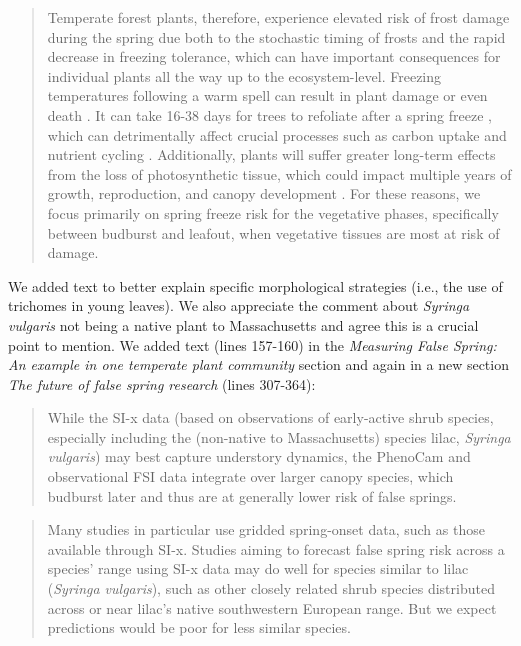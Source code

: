 \documentclass[11pt,a4paper]{article}
\begin{document}
\begin{quotation}
Temperate forest plants, therefore, experience elevated risk of frost damage during the spring due both to the stochastic timing of frosts and the rapid decrease in freezing tolerance, which can have important consequences for individual plants all the way up to the ecosystem-level. Freezing temperatures following a warm spell can result in plant damage or even death \citep{Ludlum1968, Mock2007}. It can take 16-38 days for trees to refoliate after a spring freeze \citep{Augspurger2009, Augspurger2013, Gu2008, Menzel2015}, which can detrimentally affect crucial processes such as carbon uptake and nutrient cycling \citep{Hufkens2012, Klosterman2018, Richardson2013}. Additionally, plants will suffer greater long-term effects from the loss of photosynthetic tissue, which could impact multiple years of growth, reproduction, and canopy development \citep{Vitasse2014, Xie2015}.  For these reasons, we focus primarily on spring freeze risk for the vegetative phases, specifically between budburst and leafout, when vegetative tissues are most at risk of damage.
\end{quotation}

We added text to better explain specific morphological strategies (i.e., the use of trichomes in young leaves). We also appreciate the comment about \textit{Syringa vulgaris} not being a native plant to Massachusetts and agree this is a crucial point to mention. We added text (lines 157-160) in the \textit{Measuring False Spring: An example in one temperate plant community} section and again in a new section \textit{The future of false spring research} (lines 307-364):\\

\begin{quotation}
While the SI-x data (based on observations of early-active shrub species, especially including the (non-native to Massachusetts) species lilac, \emph{Syringa vulgaris}) may best capture understory dynamics, the PhenoCam and observational FSI data integrate over larger canopy species, which budburst later and thus are at generally lower risk of false springs.
\end{quotation}

\begin{quotation}
Many studies in particular use gridded spring-onset data, such as those available through SI-x. Studies aiming to forecast false spring risk across a species' range using SI-x data may do well for species similar to lilac (\emph{Syringa vulgaris}), such as other closely related shrub species distributed across or near lilac's native southwestern European range. But we expect predictions would be poor for less similar species.
\end{quotation}
\end{document}
